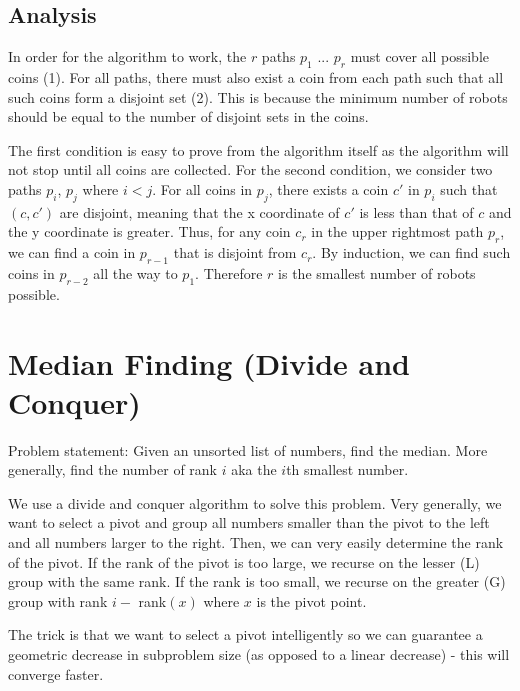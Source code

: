 \documentclass[10pt]{article}
\begin{document}
\subsection*{Analysis}
In order for the algorithm to work, the $r$ paths $p_1$ ... $p_r$ must cover all possible coins (1). For all paths, there must also exist a coin from each path such that all such coins form a disjoint set (2). This is because the minimum number of robots should be equal to the number of disjoint sets in the coins.

The first condition is easy to prove from the algorithm itself as the algorithm will not stop until all coins are collected. For the second condition, we consider two paths $p_i$, $p_j$ where $i < j$. For all coins in $p_j$, there exists a coin $c'$ in $p_i$ such that $(c, c')$ are disjoint, meaning that the x coordinate of $c'$ is less than that of $c$ and the y coordinate is greater. Thus, for any coin $c_r$ in the upper rightmost path $p_r$, we can find a coin in $p_{r-1}$ that is disjoint from $c_r$. By induction, we can find such coins in $p_{r-2}$ all the way to $p_1$. Therefore $r$ is the smallest number of robots possible. 

\section{Median Finding (Divide and Conquer)}
Problem statement: Given an unsorted list of numbers, find the median. More generally, find the number of rank $i$ aka the $i$th smallest number.

We use a divide and conquer algorithm to solve this problem. Very generally, we want to select a pivot and group all numbers smaller than the pivot to the left and all numbers larger to the right. Then, we can very easily determine the rank of the pivot. If the rank of the pivot is too large, we recurse on the lesser (L) group with the same rank. If the rank is too small, we recurse on the greater (G) group with rank $i -$ rank$(x)$ where $x$ is the pivot point.

The trick is that we want to select a pivot intelligently so we can guarantee a geometric decrease in subproblem size (as opposed to a linear decrease) - this will converge faster.
\end{document}
